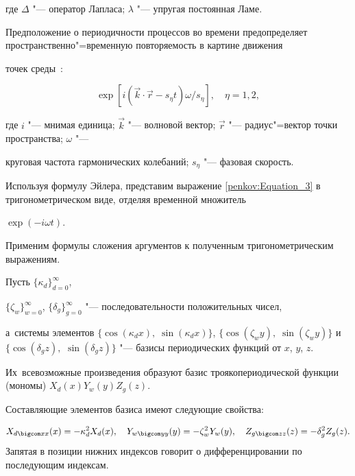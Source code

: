 где $\Delta$ "--- оператор Лапласа; $\lambda$ "--- упругая постоянная Ламе.



Предположение о периодичности процессов во времени предопределяет пространственно"=временную повторяемость в картине движения

точек среды~\cite{penkov:GVT}:

\begin{equation}

\label{penkov:Equation_3} \exp \left[ i \left( \vec{k} \cdot \vec{r} - s _{\eta} t \right) \omega / s _{\eta} \right], \quad \eta

= 1, 2,

\end{equation}

где $i$ "--- мнимая единица; $\vec{k}$ "--- волновой вектор; $\vec{r}$ "--- радиус"=вектор точки пространства; $\omega$ "---

круговая частота гармонических колебаний; $s_{\eta}$ "--- фазовая скорость.



Используя формулу Эйлера, представим выражение \eqref{penkov:Equation_3} в тригонометрическом виде, отделяя временной множитель

$\exp({- i \omega t})$. 

Применим формулы сложения аргументов к полученным тригонометрическим выражениям. 

Пусть $\{ \kappa _{d} \}_{d=0}^{\infty}$,

$\{ \zeta _{w} \}_{w=0}^{\infty}$, $\{ \delta _{g} \}_{g=0}^{\infty}$ "--- последовательности положительных чисел, 

а~системы элементов $\{ \cos ( \kappa_{d} x ), \; \sin ( \kappa _{d} x ) \}$, $\{ \cos ( \zeta _{w} y ), \; \sin (\zeta _{w} y )

\}$ и  $\{ \cos ( \delta _{g} z ), $ $ \sin ( \delta _{g} z ) \}$ "--- базисы периодических функций от $x$, $y$, $z$. 

Их~всевозможные \linebreak произведения образуют базис троякопериодической функции (мономы) \linebreak $X _{d} ( x ) Y _{w} ( y ) Z _{g} ( z )$.

Составляющие элементов базиса имеют следующие свойства: 

$$X _{d \bigcom xx} ( x ) = -\kappa _{d}^{2} X _{d} ( x ),\quad  Y _{w \bigcom yy} ( y ) = -\zeta _{w}^{2} Y _{w} ( y ), \quad Z _{g \bigcom zz} ( z ) = -\delta _{g}^{2}  Z _{g} ( z ).$$ Запятая в позиции нижних индексов говорит о дифференцировании по последующим индексам.



